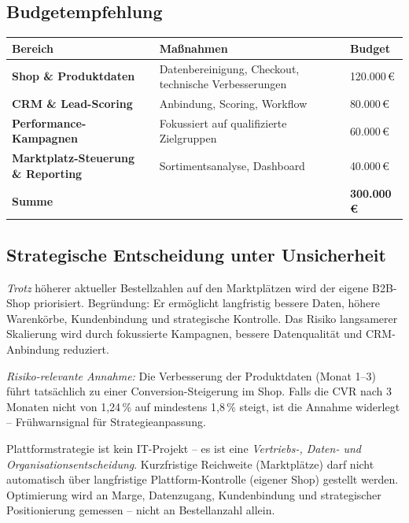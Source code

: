 \documentclass[11pt,a4paper,oneside]{article}
\begin{document}
\subsection{Budgetempfehlung}

\begin{tabularx}{\linewidth}{@{}>{\bfseries}lXl@{}}
\toprule
Bereich                          & Maßnahmen                                & Budget \\
\midrule
Shop \& Produktdaten              & Datenbereinigung, Checkout, technische Verbesserungen & 120{.}000\,\euro{} \\
CRM \& Lead-Scoring               & Anbindung, Scoring, Workflow                & 80{.}000\,\euro{} \\
Performance-Kampagnen              & Fokussiert auf qualifizierte Zielgruppen     & 60{.}000\,\euro{} \\
Marktplatz-Steuerung \& Reporting & Sortimentsanalyse, Dashboard                 & 40{.}000\,\euro{} \\
\midrule
\textbf{Summe}                    &                                          & \textbf{300{.}000\,\euro{}} \\
\bottomrule
\end{tabularx}

\subsection{Strategische Entscheidung unter Unsicherheit}

\emph{Trotz} höherer aktueller Bestellzahlen auf den Marktplätzen wird der eigene B2B-Shop priorisiert. Begründung: Er ermöglicht langfristig bessere Daten, höhere Warenkörbe, Kundenbindung und strategische Kontrolle. Das Risiko langsamerer Skalierung wird durch fokussierte Kampagnen, bessere Datenqualität und CRM-Anbindung reduziert.

\emph{Risiko-relevante Annahme:} Die Verbesserung der Produktdaten (Monat 1--3) führt tatsächlich zu einer Conversion-Steigerung im Shop. Falls die CVR nach 3 Monaten nicht von 1{,}24\,\% auf mindestens 1{,}8\,\% steigt, ist die Annahme widerlegt -- Frühwarnsignal für Strategieanpassung.

\begin{merkbox}
Plattform­strategie ist kein IT-Projekt -- es ist eine \emph{Vertriebs-, Daten- und Organisations­entscheidung}. Kurzfristige Reichweite (Marktplätze) darf nicht automatisch über langfristige Plattform-Kontrolle (eigener Shop) gestellt werden. Optimierung wird an Marge, Datenzugang, Kundenbindung und strategischer Positionierung gemessen -- nicht an Bestellanzahl allein.
\end{merkbox}
\end{document}
